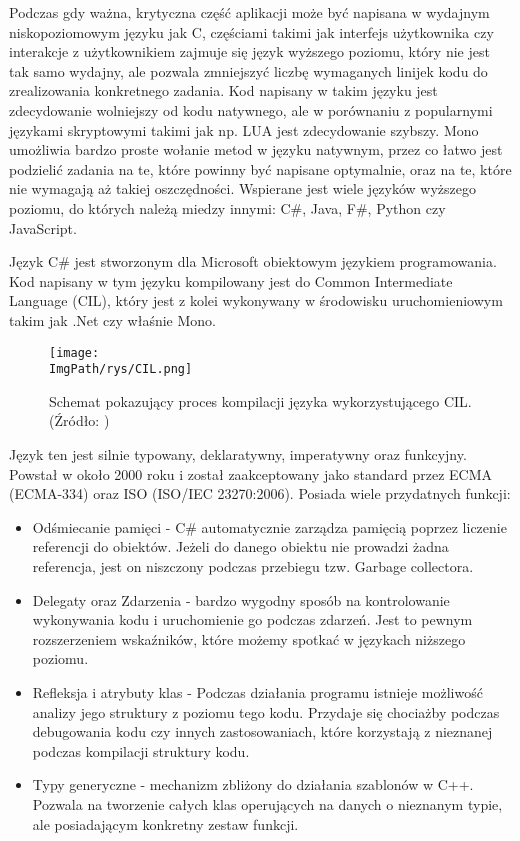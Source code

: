 \documentclass[a4paper,12pt,twoside,openany]{report}
\newcommand{\ImgPath}{.}
\begin{document}
Podczas gdy ważna, krytyczna część aplikacji może być napisana w wydajnym niskopoziomowym języku jak C, częściami takimi jak interfejs użytkownika czy interakcje z użytkownikiem zajmuje się język wyższego poziomu, który nie jest tak samo wydajny, ale pozwala zmniejszyć liczbę wymaganych linijek kodu do zrealizowania konkretnego zadania. Kod napisany w takim języku jest zdecydowanie wolniejszy od kodu natywnego, ale w porównaniu z popularnymi językami skryptowymi takimi jak np. LUA jest zdecydowanie szybszy. Mono umożliwia bardzo proste wołanie metod w języku natywnym, przez co łatwo jest podzielić zadania na te, które powinny być napisane optymalnie, oraz na te, które nie wymagają aż takiej oszczędności. Wspierane jest wiele języków wyższego poziomu, do których należą miedzy innymi: C\#, Java, F\#, Python czy JavaScript.

Język C\# jest stworzonym dla Microsoft obiektowym językiem programowania. Kod napisany w tym języku kompilowany jest do Common Intermediate Language (CIL), który jest z kolei wykonywany w środowisku uruchomieniowym  takim jak .Net czy właśnie Mono.  


\begin{figure}[!htbp]
	\begin{center}
\centering
\texttt{[image: \\ImgPath/rys/CIL.png]}
\end{center}
	\caption{Schemat pokazujący proces kompilacji języka wykorzystującego CIL. (Źródło: \cite{CLI_wiki})}
	\label{CIL}
\end{figure}

Język ten jest silnie typowany, deklaratywny, imperatywny oraz funkcyjny. Powstał w około 2000 roku i został zaakceptowany jako standard przez ECMA (ECMA-334) oraz ISO (ISO/IEC 23270:2006). Posiada wiele przydatnych funkcji:
\begin{itemize}
    \item Odśmiecanie pamięci - C\# automatycznie zarządza pamięcią poprzez liczenie referencji do obiektów. Jeżeli do danego obiektu nie prowadzi żadna referencja, jest on niszczony podczas przebiegu tzw. Garbage collectora.
    \item Delegaty oraz Zdarzenia - bardzo wygodny sposób na kontrolowanie wykonywania kodu i uruchomienie go podczas zdarzeń. Jest to pewnym rozszerzeniem wskaźników, które możemy spotkać w językach niższego poziomu.
    \item Refleksja i atrybuty klas - Podczas działania programu istnieje możliwość analizy jego struktury z poziomu tego kodu. Przydaje się chociażby podczas debugowania kodu czy innych zastosowaniach, które korzystają z nieznanej podczas kompilacji struktury kodu.
    \item Typy generyczne - mechanizm zbliżony do działania szablonów w C++. Pozwala na tworzenie całych klas operujących na danych o nieznanym typie, ale posiadającym konkretny zestaw funkcji.
\end{itemize}
\end{document}
